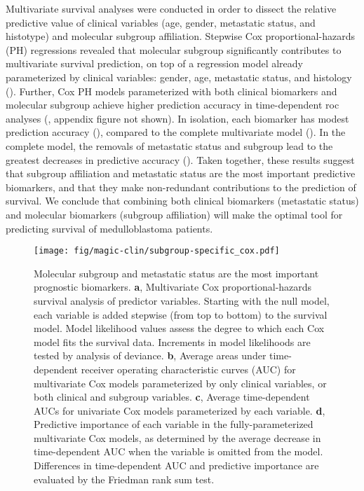 Multivariate survival analyses were conducted in order to dissect the relative predictive value of clinical variables (age, gender, metastatic status, and histotype) and molecular subgroup affiliation. Stepwise Cox proportional-hazards (PH) regressions revealed that molecular subgroup significantly contributes to multivariate survival prediction, on top of a regression model already parameterized by clinical variables: gender, age, metastatic status, and histology (). Further, Cox PH models parameterized with both clinical biomarkers and molecular subgroup achieve higher prediction accuracy in time-dependent \gls{roc} analyses (, appendix figure not shown). In isolation, each biomarker has modest prediction accuracy (), compared to the complete multivariate model (). In the complete model, the removals of metastatic status and subgroup lead to the greatest decreases in predictive accuracy (). Taken together, these results suggest that subgroup affiliation and metastatic status are the most important predictive biomarkers, and that they make non-redundant contributions to the prediction of survival. We conclude that combining both clinical biomarkers (metastatic status) and molecular biomarkers (subgroup affiliation) will make the optimal tool for predicting survival of medulloblastoma patients.

\begin{figure}[h]
	\begin{center}
		\texttt{[image: fig/magic-clin/subgroup-specific\_cox.pdf]}
	\end{center}
	\caption[Molecular subgroup and metastatic status are the most important prognostic biomarkers]
	{
	Molecular subgroup and metastatic status are the most important prognostic biomarkers.
	\textbf{a}, Multivariate Cox proportional-hazards survival analysis of predictor variables. Starting with the null model, each variable is added stepwise (from top to bottom) to the survival model. Model likelihood values assess the degree to which each Cox model fits the survival data. Increments in model likelihoods are tested by analysis of deviance. 
	\textbf{b}, Average areas under time-dependent receiver operating characteristic curves (AUC) for multivariate Cox models parameterized by only clinical variables, or both clinical and subgroup variables.
	\textbf{c}, Average time-dependent AUCs for univariate Cox models parameterized by each variable.
	\textbf{d}, Predictive importance of each variable in the fully-parameterized multivariate Cox models, as determined by the average decrease in time-dependent AUC when the variable is omitted from the model.
	Differences in time-dependent AUC and predictive importance are evaluated by the Friedman rank sum test.
	}
	\label{fig:subgroup-specific_cox}
\end{figure}


